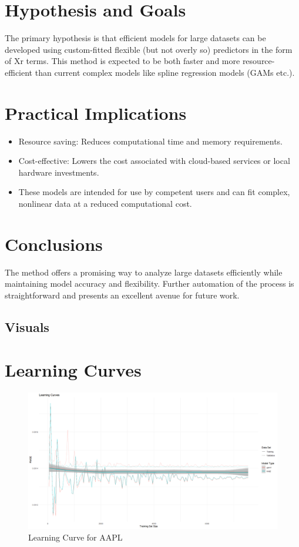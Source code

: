 \documentclass{article}
\begin{document}
\section{Hypothesis and Goals}
The primary hypothesis is that efficient models for large datasets can be developed using custom-fitted flexible (but not overly so) predictors in the form of Xr terms. This method is expected to be both faster and more resource-efficient than current complex models like spline regression models (GAMs etc.).

\section{Practical Implications}
\begin{itemize}
    \item Resource saving: Reduces computational time and memory requirements.
    \item Cost-effective: Lowers the cost associated with cloud-based services or local hardware investments.
    \item These models are intended for use by competent users and can fit complex, nonlinear data at a reduced computational cost.
\end{itemize}

\section{Conclusions}
The method offers a promising way to analyze large datasets efficiently while maintaining model accuracy and flexibility. Further automation of the process is straightforward and presents an excellent avenue for future work.


\subsection{Visuals}

\section{Learning Curves}

\begin{figure}[h]
    \centering
    \includegraphics[width=0.9\linewidth]{visuals/Learning_curves_aapl.png}
    \caption{Learning Curve for AAPL}
\end{figure}
\end{document}
